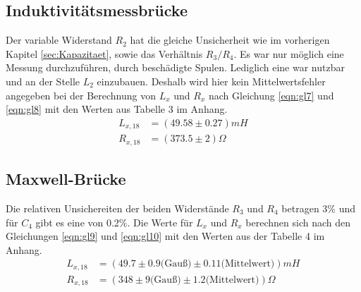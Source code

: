 \subsection{Induktivitätsmessbrücke}
\label{sec:Induktiv}
Der variable Widerstand $R_2$ hat die gleiche Unsicherheit wie im vorherigen Kapitel \ref{sec:Kapazitaet}, sowie das Verhältnis $R_3/R_4$.
Es war nur möglich eine Messung durchzuführen, durch beschädigte Spulen.
Lediglich eine war nutzbar und an der Stelle $L_2$ einzubauen.
Deshalb wird hier kein Mittelwertsfehler angegeben bei der Berechnung von $L_x$ und $R_x$ nach Gleichung \eqref{eqn:gl7} und \eqref{eqn:gl8} mit den Werten aus Tabelle 3 im Anhang.
\begin{align}
  L_{x,18} &= (49.58 \pm 0.27) mH \\
  R_{x,18} &= (373.5 \pm 2) \Omega
\end{align}

\subsection{Maxwell-Brücke}
\label{sec:Maxwell}
Die relativen Unsichereiten der beiden Widerstände $R_3$ und $R_4$ betragen 3\% und für $C_4$ gibt es eine von 0.2\%.
Die Werte für $L_x$ und $R_x$ berechnen sich nach den Gleichungen \eqref{eqn:gl9} und \eqref{eqn:gl10} mit den Werten aus der Tabelle 4 im Anhang.
\begin{align}
  L_{x,18} &= (49.7 \pm 0.9 \textrm{(Gauß)} \pm 0.11 \textrm{(Mittelwert)}) mH \\
  R_{x,18} &= (348 \pm 9 \textrm{(Gauß)} \pm 1.2 \textrm{(Mittelwert)}) \Omega
\end{align}

